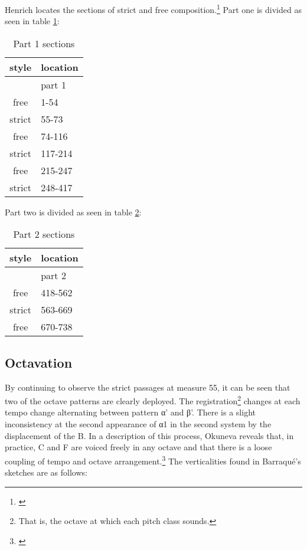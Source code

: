 Henrich locates the sections of strict and free composition.\footnote{\citet[45]{barraque-werk}} Part one is divided as seen in table \ref{tab:part-1-styles}:

\begin{table}[H]
    \centering
    \begin{tabular}{c|l}
    style & location \\
    \hline
     & part 1  \\
    free & 1-54 \\
    strict & 55-73 \\
    free & 74-116 \\
    strict &  117-214 \\
    free & 215-247 \\
    strict & 248-417 \\
\end{tabular}
    \caption{Part 1 sections}
    \label{tab:part-1-styles}
\end{table}

Part two is divided as seen in table \ref{tab:part-2-styles}:

\begin{table}[H]
    \centering
    \begin{tabular}{c|l}
    style & location \\
    \hline
     & part 2  \\
    free & 418-562 \\
    strict & 563-669 \\
    free & 670-738 \\
\end{tabular}
    \caption{Part 2 sections}
    \label{tab:part-2-styles}
\end{table}


\subsection{Octavation}

By continuing to observe the strict passages at measure 55, it can be seen that two of the octave patterns are clearly deployed. The registration\footnote{That is, the octave at which each pitch class sounds.} changes at each tempo change alternating between pattern α' and β'. There is a slight inconsistency at the second appearance of α1 in the second system by the displacement of the B\mynatural. In a description of this process, Okuneva reveals that, in practice, C\mysharp \hspace{0.5mm} and F\mysharp \hspace{0.5mm} are voiced freely in any octave and that there is a loose coupling of tempo and octave arrangement.\footnote{\citet[2]{sonata-russia}} The verticalities found in Barraqué's sketches are as follows:

